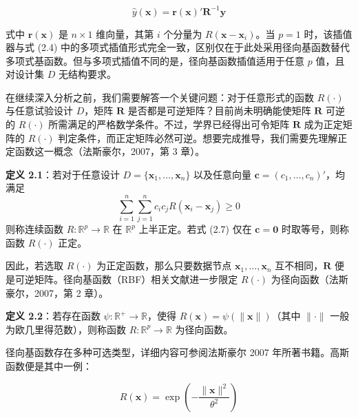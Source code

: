 \documentclass{ctexart}
\begin{document}
\begin{equation*}
\widehat{y}(\boldsymbol{x})=\boldsymbol{r}(\boldsymbol{x})'\boldsymbol{R}^{-1}\boldsymbol{y}
\tag{2.6}
\end{equation*}

式中 $\boldsymbol{r}(\boldsymbol{x})$ 是 $n\times1$ 维向量，其第 $i$ 个分量为 $R(\boldsymbol{x}-\boldsymbol{x}_i)$。当 $p=1$ 时，该插值器与式 (2.4) 中的多项式插值形式完全一致，区别仅在于此处采用径向基函数替代多项式基函数。但与多项式插值不同的是，径向基函数插值适用于任意 $p$ 值，且对设计集 $D$ 无结构要求。

在继续深入分析之前，我们需要解答一个关键问题：对于任意形式的函数 $R(\cdot)$ 与任意试验设计 $D$，矩阵 $\boldsymbol{R}$ 是否都是可逆矩阵？目前尚未明确能使矩阵 $\boldsymbol{R}$ 可逆的 $R(\cdot)$ 所需满足的严格数学条件。不过，学界已经得出可令矩阵 $\boldsymbol{R}$ 成为正定矩阵的 $R(\cdot)$ 判定条件，而正定矩阵必然可逆。想要完成推导，我们需要先理解正定函数这一概念（法斯豪尔，2007，第 3 章）。

\begin{mdquote}
\textbf{定义 2.1}：若对于任意设计 $D=\{\boldsymbol{x}_1,\dots,\boldsymbol{x}_n\}$ 以及任意向量 $\boldsymbol{c}=(c_1,\dots,c_n)'$，均满足 \begin{equation*}
\sum_{i=1}^{n}\sum_{j=1}^{n}c_ic_jR(\boldsymbol{x}_i-\boldsymbol{x}_j)\ge0\tag{2.7}
\end{equation*} 则称连续函数 $R:\mathbb{R}^p\to\mathbb{R}$ 在 $\mathbb{R}^p$ 上半正定。若式 (2.7) 仅在 $\boldsymbol{c}=\boldsymbol{0}$ 时取等号，则称函数 $R(\cdot)$ 正定。
\end{mdquote}

因此，若选取 $R(\cdot)$ 为正定函数，那么只要数据节点 $\boldsymbol{x}_1,\dots,\boldsymbol{x}_n$ 互不相同，$\boldsymbol{R}$ 便是可逆矩阵。径向基函数（RBF）相关文献进一步限定 $R(\cdot)$ 为径向函数（法斯豪尔，2007，第 2 章）。

\begin{mdquote}
\textbf{定义 2.2}：若存在函数 $\psi:\mathbb{R}^+\to\mathbb{R}$，使得 $R(\boldsymbol{x})=\psi(\|\boldsymbol{x}\|)$（其中 $\|\cdot\|$ 一般为欧几里得范数），则称函数 $R:\mathbb{R}^p\to\mathbb{R}$ 为径向函数。
\end{mdquote}

径向基函数存在多种可选类型，详细内容可参阅法斯豪尔 2007 年所著书籍。高斯函数便是其中一例：

\begin{equation*}
R(\boldsymbol{x})=\exp\left(-\frac{\|\boldsymbol{x}\|^2}{\theta^2}\right)
\tag{2.8}
\end{equation*}
\end{document}

